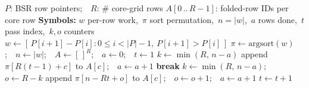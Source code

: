 \documentclass{article}
\begin{document}
\begin{algorithm}
\caption{Serpentine row balancing for BSR SpMM}
\label{alg:snake-lb}
\begin{algorithmic}[1]
\Require $P$: BSR row pointers;\ \ $R$: \# core-grid rows
\Ensure $A[0\,..\,R{-}1]$: folded-row IDs per core row
\Statex \textbf{Symbols:} $w$ per-row work,\ $\pi$ sort permutation,\ $n{=}|w|$,\ $a$ rows done,\ $t$ pass index,\ $k,o$ counters
\State $w \gets [\,P[i{+}1]{-}P[i] : 0{\le}i{<}|P|{-}1,\ P[i{+}1]{>}P[i]\,]$
\State $\pi \gets \mathrm{argsort}(w)$;\ \ $n \gets |w|$;\ \ $A \gets [\,]^{R}$;\ \ $a \gets 0$;\ \ $t \gets 1$
    \State $k \gets \min(R,\,n{-}a)$ 
        \State append $\pi[R(t{-}1){+}c]$ to $A[c]$;\ \ $a \gets a{+}1$
    \EndFor
     \State \textbf{break} \EndIf
    \State $k \gets \min(R,\,n{-}a)$;\ \ $o \gets R-k$ 
        \State append $\pi[n{-}Rt{+}o]$ to $A[c]$;\ \ $o \gets o{+}1$;\ \ $a \gets a{+}1$
    \EndFor
    \State $t \gets t+1$
\EndWhile
\end{algorithmic}
\end{algorithm}
\end{document}
